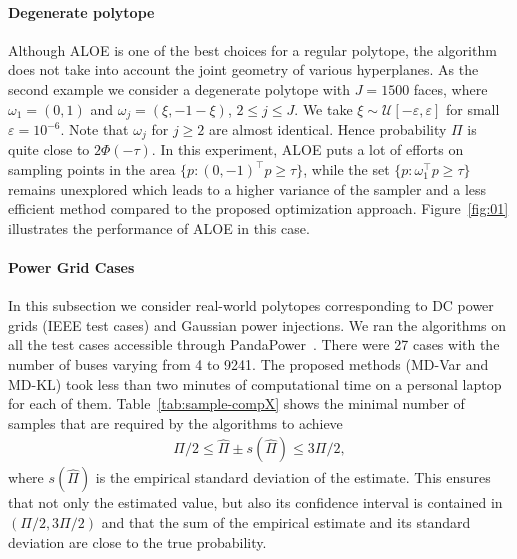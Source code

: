 \paragraph{Degenerate polytope} Although ALOE is one of the best choices for a regular polytope, the algorithm does not take into account the joint geometry of various hyperplanes. 
%
As the second example we consider a degenerate polytope with $J=1500$ faces, where $\omega_1 = (0, 1)$  and $\omega_j = (\xi, -1 - \xi)$, $2\le j \le J$. We take $\xi \sim \mathcal{U}[-\varepsilon, \varepsilon]$ for small $\varepsilon = 10^{-6}$. Note that $\omega_j$ for $j\geq 2$ are almost identical. Hence probability $\Pi$ is quite close to $2\Phi(-\tau)$. In this experiment, ALOE puts a lot of efforts on sampling points in the area $\{p: (0, -1)^\top p \ge \tau\}$, while the set $\{p: \omega_1^\top p \ge \tau\}$ remains unexplored which leads to a higher variance of the sampler and a less efficient method compared to the proposed optimization approach. Figure~\ref{fig:01} illustrates the performance of ALOE in this case. 

\paragraph{Power Grid Cases} In this subsection we consider real-world polytopes corresponding to DC power grids (IEEE test cases) and Gaussian power injections.
%
%
We ran the algorithms on all the test cases  accessible through PandaPower~\cite{pandapower.2018}. There were 27 cases with the number of buses varying from 4 to 9241. The proposed methods (MD-Var and MD-KL) took less than two minutes of computational time on a personal laptop for each of them. 
%
Table~\ref{tab:sample-compX} shows the minimal number of samples that are required by the algorithms to achieve 
\begin{align}
    \Pi/2 \le \hat\Pi \pm s(\hat\Pi) \le 3\Pi/2, \label{eq:tk}
\end{align}
where $s(\hat\Pi)$ is the empirical standard deviation of the estimate. This ensures that not only the estimated value, but also its confidence interval is contained in $(\Pi/2, 3\Pi/2)$ and that the sum of the empirical estimate and its standard deviation are close to %
the true probability. 


